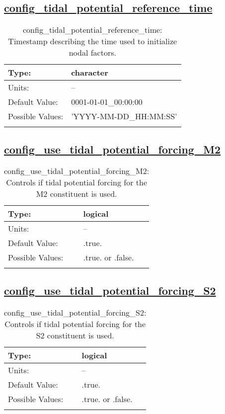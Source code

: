 \subsection[config\_tidal\_potential\_reference\_time]{\hyperref[sec:nm_tab_tidal_potential_forcing]{config\_tidal\_potential\_reference\_time}}
\label{subsec:nm_sec_config_tidal_potential_reference_time}
\begin{center}
\begin{longtable}{| p{2.0in} || p{4.0in} |}
    \hline
    Type: & character \\
    \hline
    Units: & -- \\
    \hline
    Default Value: & 0001-01-01\_00:00:00 \\
    \hline
    Possible Values: & 'YYYY-MM-DD\_HH:MM:SS' \\
    \hline
    \caption{config\_tidal\_potential\_reference\_time: Timestamp describing the time used to initialize nodal factors.}
\end{longtable}
\end{center}
\subsection[config\_use\_tidal\_potential\_forcing\_M2]{\hyperref[sec:nm_tab_tidal_potential_forcing]{config\_use\_tidal\_potential\_forcing\_M2}}
\label{subsec:nm_sec_config_use_tidal_potential_forcing_M2}
\begin{center}
\begin{longtable}{| p{2.0in} || p{4.0in} |}
    \hline
    Type: & logical \\
    \hline
    Units: & -- \\
    \hline
    Default Value: & .true. \\
    \hline
    Possible Values: & .true. or .false. \\
    \hline
    \caption{config\_use\_tidal\_potential\_forcing\_M2: Controls if tidal potential forcing for the M2 constituent is used.}
\end{longtable}
\end{center}
\subsection[config\_use\_tidal\_potential\_forcing\_S2]{\hyperref[sec:nm_tab_tidal_potential_forcing]{config\_use\_tidal\_potential\_forcing\_S2}}
\label{subsec:nm_sec_config_use_tidal_potential_forcing_S2}
\begin{center}
\begin{longtable}{| p{2.0in} || p{4.0in} |}
    \hline
    Type: & logical \\
    \hline
    Units: & -- \\
    \hline
    Default Value: & .true. \\
    \hline
    Possible Values: & .true. or .false. \\
    \hline
    \caption{config\_use\_tidal\_potential\_forcing\_S2: Controls if tidal potential forcing for the S2 constituent is used.}
\end{longtable}
\end{center}
